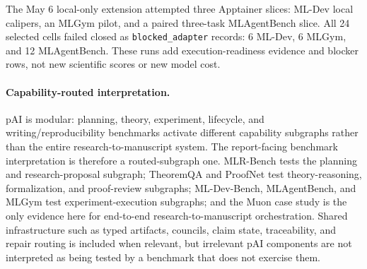 \documentclass{article}
\begin{document}
The May 6 local-only extension attempted three Apptainer slices: ML-Dev local calipers, an MLGym pilot, and a paired three-task MLAgentBench slice. All 24 selected cells failed closed as \texttt{blocked\_adapter} records: 6 ML-Dev, 6 MLGym, and 12 MLAgentBench. These runs add execution-readiness evidence and blocker rows, not new scientific scores or new model cost.

\paragraph{Capability-routed interpretation.}
pAI is modular: planning, theory, experiment, lifecycle, and writing/reproducibility benchmarks activate different capability subgraphs rather than the entire research-to-manuscript system. The report-facing benchmark interpretation is therefore a routed-subgraph one. MLR-Bench tests the planning and research-proposal subgraph; TheoremQA and ProofNet test theory-reasoning, formalization, and proof-review subgraphs; ML-Dev-Bench, MLAgentBench, and MLGym test experiment-execution subgraphs; and the Muon case study is the only evidence here for end-to-end research-to-manuscript orchestration. Shared infrastructure such as typed artifacts, councils, claim state, traceability, and repair routing is included when relevant, but irrelevant pAI components are not interpreted as being tested by a benchmark that does not exercise them.
\end{document}
